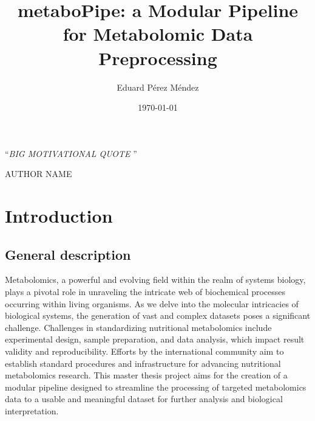 \documentclass[ENG, BIB]{TFUOC}%
\title{metaboPipe: a Modular Pipeline for Metabolomic Data Preprocessing}
\author{Eduard Pérez Méndez}
\date{\today}
\begin{document}
            
            \estructura
            
            \newpage\null\thispagestyle{empty}
            
            \vspace*{0.4\textheight} 
            
            \noindent\enquote{\itshape BIG MOTIVATIONAL QUOTE
            }\bigbreak 
            
            
            

            \hfill AUTHOR NAME
            
            \newpage
            
            
            \tableofcontents
            
\listoffigures

\listoftables



\chapter{Introduction}

\section{General description}

Metabolomics, a powerful and evolving field within the realm of systems biology, plays a pivotal role in unraveling the intricate web of biochemical processes occurring within living organisms. As we delve into the molecular intricacies of biological systems, the generation of vast and complex datasets poses a significant challenge. Challenges in standardizing nutritional metabolomics include experimental design, sample preparation, and data analysis, which impact result validity and reproducibility. Efforts by the international community aim to establish standard procedures and infrastructure for advancing nutritional metabolomics research. This master thesis project aims for the creation of a modular pipeline designed to streamline the processing of targeted metabolomics data to a usable and meaningful dataset for further analysis and biological interpretation.
\end{document}
